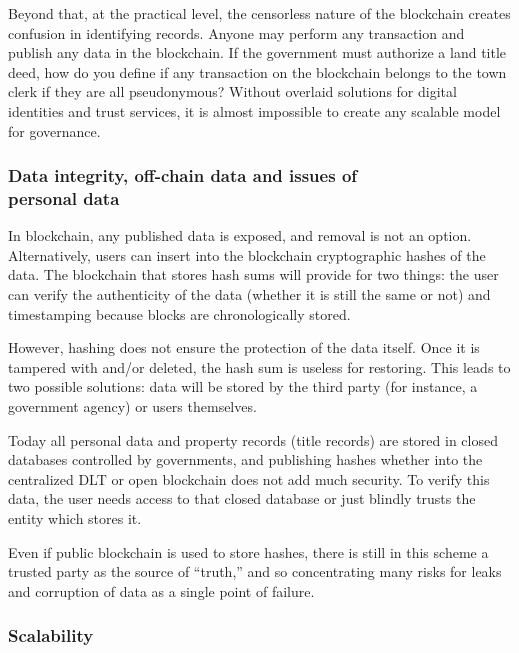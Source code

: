 \begin{multicols}{2}
Beyond that, at the practical level, the censorless nature of the blockchain creates confusion in identifying records. Anyone may perform any transaction and publish any data in the blockchain. If the government must authorize a land title deed, how do you define if any transaction on the blockchain belongs to the town clerk if they are all pseudonymous? Without overlaid solutions for digital identities and trust services, it is almost impossible to create any scalable model for governance.

\vspace{-.7cm}

\subsubsection{Data integrity, off-chain data and issues of\\ personal data}\label{subsubsec-03.1.4}

\vspace{-.4cm}

In blockchain, any published data is exposed, and removal is not an option. Alternatively, users can insert into the blockchain cryptographic hashes of the data. The blockchain that stores hash sums will provide for two things: the user can verify the authenticity of the data (whether it is still the same or not) and timestamping because blocks are chronologically stored.

However, hashing does not ensure the protection of the data itself. Once it is tampered with and/or deleted, the hash sum is useless for restoring. This leads to two possible solutions: data will be stored by the third party (for instance, a government agency) or users themselves.

Today all personal data and property records (title records) are stored in closed databases controlled by governments, and publishing hashes whether into the centralized DLT or open blockchain does not add much security. To verify this data, the user needs access to that closed database or just blindly trusts the entity which stores it.

Even if public blockchain is used to store hashes, there is still in this scheme a trusted party as the source of “truth,” and so concentrating many risks for leaks and corruption of data as a single point of failure.

\vspace{-.7cm}

\subsubsection{Scalability}\label{subsubsec-03.1.5}


\end{multicols}
